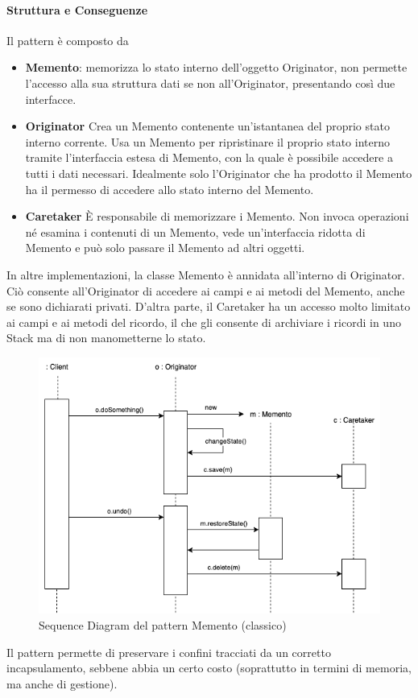 \paragraph{Struttura e Conseguenze} Il pattern è composto da
\begin{itemize}
    \item \textbf{Memento}: memorizza lo stato interno dell’oggetto Originator, non permette l’accesso alla sua struttura dati se non all’Originator, presentando così due interfacce.
    \item \textbf{Originator} Crea un Memento contenente un’istantanea del proprio stato interno corrente. Usa un Memento per ripristinare il proprio stato interno tramite l’interfaccia estesa di Memento, con la quale è possibile accedere a tutti i dati necessari. Idealmente solo l’Originator che ha prodotto il Memento ha il permesso di accedere allo stato interno del Memento. 
    \item \textbf{Caretaker} È responsabile di memorizzare i Memento. Non invoca operazioni né esamina i contenuti di un Memento, vede un’interfaccia ridotta di Memento e può solo passare il Memento ad altri oggetti.
\end{itemize}

In altre implementazioni, la classe Memento è annidata all'interno di Originator. Ciò consente all'Originator di accedere ai campi e ai metodi del Memento, anche se sono dichiarati privati. D'altra parte, il Caretaker ha un accesso molto limitato ai campi e ai metodi del ricordo, il che gli consente di archiviare i ricordi in uno Stack ma di non manometterne lo stato.

\begin{figure}[H]
    \centering
    \includegraphics[width=1\linewidth]{assets/pattern/memento/memento-sequence.drawio.png}
    \caption{Sequence Diagram del pattern Memento (classico)}
\end{figure}

Il pattern permette di preservare i confini tracciati da un corretto incapsulamento, sebbene abbia un certo costo (soprattutto in termini di memoria, ma anche di gestione).

\newpage